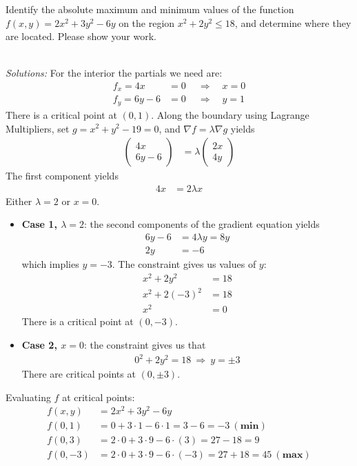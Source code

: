 \ifnum {}
\question[6] Identify the absolute maximum and minimum values of the function $f(x,y) = 2x^2 + 3y^2 - 6y$ on the region $x^2+2y^2 \le 18$, and determine where they are located. Please show your work. 
\ifnum {} {\color{DarkBlue} \\ \textit{Solutions:} For the interior the partials we need are: 
\begin{align*}
    f_x = 4x &=0 \ \quad \Rightarrow \quad x= 0 \\
    f_y = 6y -6 &=0 \ \quad \Rightarrow \quad y= 1 
\end{align*}
There is a critical point at $(0,1)$. Along the boundary using Lagrange Multipliers, set $g = x^2 + y^2 - 19 = 0$, and $\nabla f = \lambda \nabla g$ yields
\begin{align}
        \begin{pmatrix} 4x \\ 6y-6 \end{pmatrix} 
        &= \lambda \begin{pmatrix} 2x\\4y \end{pmatrix} 
    \end{align}
    The first component yields
    \begin{align}
        4x &= 2\lambda x
    \end{align}
    Either $\lambda =2$ or $x=0$. 
    \begin{itemize}
        \item \textbf{Case 1, $\lambda =2$}: the second components of the gradient equation yields
        \begin{align}
            6y-6 &= 4\lambda y = 8y\\
            2y &= -6
        \end{align} which implies $y = -3$. The constraint gives us values of $y$: 
        \begin{align}
            x^2 + 2y^2 &= 18 \\ 
            x^2 + 2(-3)^2 &= 18 \\ 
            x^2 &= 0
        \end{align}
        There is a critical point at $(0,-3)$.
        \item \textbf{Case 2, $x=0$}: the constraint gives us that 
        \begin{align}
            0^2+2y^2 = 18 \ \Rightarrow \ y = \pm 3
        \end{align}
        There are critical points at $(0, \pm 3)$. 
    \end{itemize}
    Evaluating $f$ at critical points: 
    \begin{align}
        f(x,y) &= 2x^2 + 3y^2 - 6y\\
        f(0,1) &= 0 + 3\cdot 1 - 6\cdot 1 = 3 - 6 = -3 \ (\textbf{min})\\ 
        f(0,3) &= 2\cdot 0 + 3\cdot 9 - 6\cdot(3)  = 27 - 18 = 9\\
        f(0,-3) &= 2\cdot 0 + 3\cdot 9 - 6\cdot(-3) = 27 + 18 = 45 \ (\textbf{max})
    \end{align}
    } 
   \else
      
